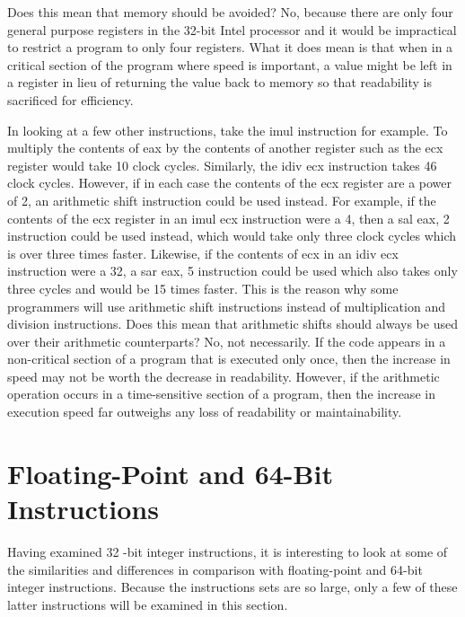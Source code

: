\documentclass[10pt]{book}
\begin{document}
Does this mean that memory should be avoided? No, because there are only four general purpose registers in the 32-bit Intel processor and it would be impractical to restrict a program to only four registers. What it does mean is that when in a critical section of the program where speed is important, a value might be left in a register in lieu of returning the value back to memory so that readability is sacrificed for efficiency.

In looking at a few other instructions, take the imul instruction for example. To multiply the contents of eax by the contents of another register such as the ecx register would take 10 clock cycles. Similarly, the idiv ecx instruction takes 46 clock cycles. However, if in each case the contents of the ecx register are a power of 2, an arithmetic shift instruction could be used instead. For example, if the contents of the ecx register in an imul ecx instruction were a 4, then a sal eax, 2 instruction could be used instead, which would take only three clock cycles which is over three times faster. Likewise, if the contents of ecx in an idiv ecx instruction were a 32, a sar eax, 5 instruction could be used which also takes only three cycles and would be 15 times faster. This is the reason why some programmers will use arithmetic shift instructions instead of multiplication and division instructions. Does this mean that arithmetic shifts should always be used over their arithmetic counterparts? No, not necessarily. If the code appears in a non-critical section of a program that is executed only once, then the increase in speed may not be worth the decrease in readability. However, if the arithmetic operation occurs in a time-sensitive section of a program, then the increase in execution speed far outweighs any loss of readability or maintainability.

\section{Floating-Point and 64-Bit Instructions}
Having examined 32 -bit integer instructions, it is interesting to look at some of the similarities and differences in comparison with floating-point and 64-bit integer instructions. Because the instructions sets are so large, only a few of these latter instructions will be examined in this section.
\end{document}
